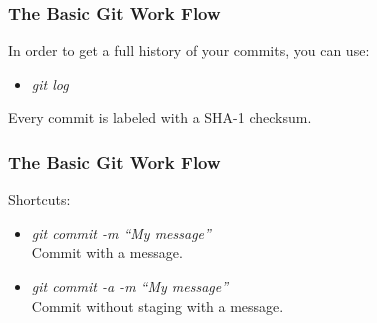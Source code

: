 \begin{frame}
\frametitle{\large The Basic Git Work Flow}
In order to get a full history of your commits, you can use:
\begin{itemize}
\item \emph{git log}
\end{itemize}
\vspace{3mm}
Every commit is labeled with a SHA-1 checksum.
\end{frame}
\note{}

\begin{frame}
\frametitle{\large The Basic Git Work Flow}
Shortcuts:
\begin{itemize}
\item \emph{git commit -m ``My message''}\\
Commit with a message.
\item \emph{git commit -a -m ``My message''}\\
Commit without staging with a message.
\end{itemize}
\end{frame}
\note{}